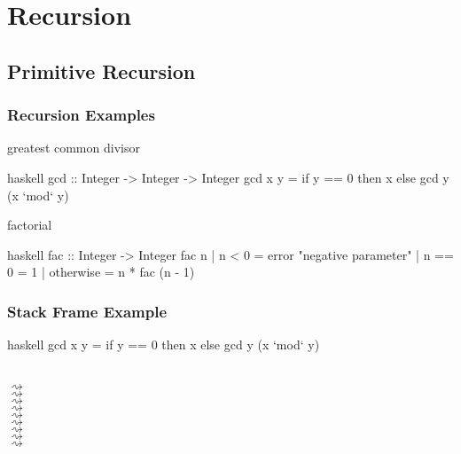 \documentclass[dvipsnames]{beamer}
\theoremstyle{plain}
\begin{document}
\section{Recursion}

\subsection{Primitive Recursion}

\begin{frame}[fragile]
  \frametitle{Recursion Examples}

  \begin{exampleblock}{greatest common divisor}
    \begin{pygments}{haskell}
gcd :: Integer -> Integer -> Integer
gcd x y = if y == 0 then x else gcd y (x `mod` y)
    \end{pygments}
  \end{exampleblock}

  \pause
  \begin{exampleblock}{factorial}
    \begin{pygments}{haskell}
fac :: Integer -> Integer
fac n
  | n < 0     = error "negative parameter"
  | n == 0    = 1
  | otherwise = n * fac (n - 1)
    \end{pygments}
  \end{exampleblock}
\end{frame}

\begin{frame}[fragile]
  \frametitle{Stack Frame Example}

  \begin{exampleblock}{}
    \begin{pygments}{haskell}
gcd x y = if y == 0 then x else gcd y (x `mod` y)
    \end{pygments}

    \pause
    \\
    $\rightsquigarrow$ \\
    \hspace{16pt}$\rightsquigarrow$ \\
    \hspace{32pt}$\rightsquigarrow$ \\
    \hspace{48pt}$\rightsquigarrow$ \\
    \hspace{64pt}$\rightsquigarrow$ \\
    \hspace{48pt}$\rightsquigarrow$ \\
    \hspace{32pt}$\rightsquigarrow$ \\
    \hspace{16pt}$\rightsquigarrow$ \\
    $\rightsquigarrow$ \\
  \end{exampleblock}
\end{frame}
\end{document}
